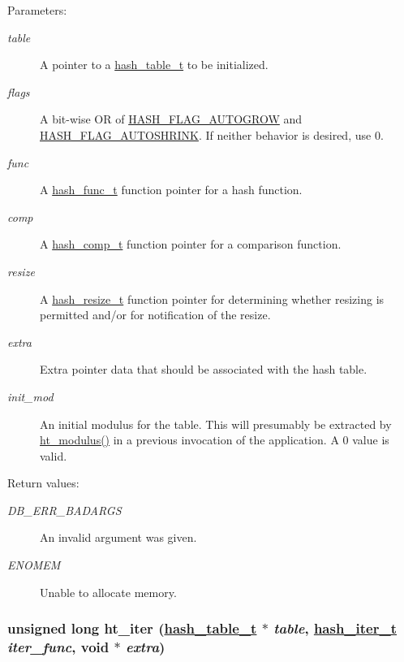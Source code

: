\begin{Desc}
\item[Parameters:]
\begin{description}
\item[{\em table}]A pointer to a \hyperlink{group__dbprim__hash_a0}{hash\_\-table\_\-t} to be initialized. \item[{\em flags}]A bit-wise OR of \hyperlink{group__dbprim__hash_a16}{HASH\_\-FLAG\_\-AUTOGROW} and \hyperlink{group__dbprim__hash_a17}{HASH\_\-FLAG\_\-AUTOSHRINK}. If neither behavior is desired, use 0. \item[{\em func}]A \hyperlink{group__dbprim__hash_a3}{hash\_\-func\_\-t} function pointer for a hash function. \item[{\em comp}]A \hyperlink{group__dbprim__hash_a4}{hash\_\-comp\_\-t} function pointer for a comparison function. \item[{\em resize}]A \hyperlink{group__dbprim__hash_a5}{hash\_\-resize\_\-t} function pointer for determining whether resizing is permitted and/or for notification of the resize. \item[{\em extra}]Extra pointer data that should be associated with the hash table. \item[{\em init\_\-mod}]An initial modulus for the table. This will presumably be extracted by \hyperlink{group__dbprim__hash_a22}{ht\_\-modulus()} in a previous invocation of the application. A 0 value is valid.\end{description}
\end{Desc}
\begin{Desc}
\item[Return values:]
\begin{description}
\item[{\em DB\_\-ERR\_\-BADARGS}]An invalid argument was given. \item[{\em ENOMEM}]Unable to allocate memory. \end{description}
\end{Desc}
\hypertarget{group__dbprim__hash_a11}{
\subsubsection[ht\_\-iter]{\setlength{\rightskip}{0pt plus 5cm}unsigned long ht\_\-iter (\hyperlink{dbprim_8h_a0}{hash\_\-table\_\-t} $\ast$ {\em table}, \hyperlink{dbprim_8h_a2}{hash\_\-iter\_\-t} {\em iter\_\-func}, void $\ast$ {\em extra})}}
\label{group__dbprim__hash_a11}


